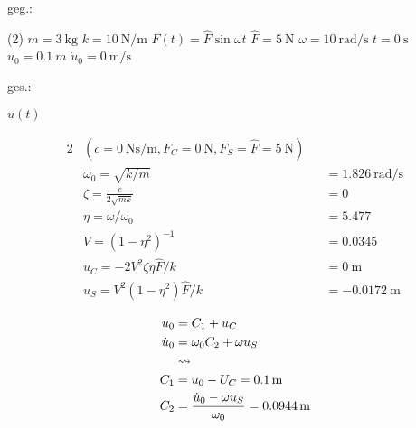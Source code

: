 \begin{questions}

\vspace{1em}

    

    \begin{minipage}[t]{.49\linewidth}
    geg.:
        \begin{tasks} (2)
            \task[] $m = \SI{3}{\kilo\gram}$
            \task[] $k = \SI{10}{\newton\per\meter}$
            \task[] $F(t) = \hat{F} \sin{\omega t}$
            \task[] $\hat{F} = \SI{5}{\newton}$
            \task[] $\omega = \SI{10}{\radian\per\second}$
            \task[] $t=\SI{0}{\second}$
            \task[] $u_0 = \SI{0.1}{m}$
            \task[] $\dot{u}_0 = \SI{0}{\meter\per\second}$
        \end{tasks}
    \end{minipage}
    \begin{minipage}[t]{.49\linewidth}
        ges.:
        \begin{tasks}
            \task[] $u(t)$
        \end{tasks}
    \end{minipage}

    \begin{solution}
        \begin{alignat*}{2}
            &(c = \SI{0}{\newton\second\per\meter}, F_C = \SI{0}{\newton}, F_S = \hat{F} = \SI{5}{\newton})\\
            &\omega_0 = \sqrt{k/m} &&= \SI{1.826}{\radian\per\second} \\
            &\zeta = \frac{c}{2\sqrt{mk}} &&= 0 \\
            &\eta = \omega/\omega_0 &&= 5.477\\
            &V = (1-\eta^2)^{-1} &&=  0.0345 \\
            &u_C = -2V^2\zeta\eta\hat{F}/k &&= \SI{0}{\meter} \\
            &u_S = V^2(1-\eta^2)\hat{F}/k &&= \SI{-0.0172}{\meter}
        \end{alignat*}

        \begin{align*}
            u_0 &= C_1 + u_C \\
            \dot{u}_0 &= \omega_0 C_2+\omega u_S\\
            &\rightsquigarrow \\
            C_1 &=  u_0 - U_C = \SI{0.1}{\meter}\\
            C_2 &= \frac{\dot{u}_0 - \omega u_S}{\omega_0} = \SI{0.0944}{\meter} \\
            \vspace{1cm}
        \end{align*}


\end{solution}
\end{questions}
